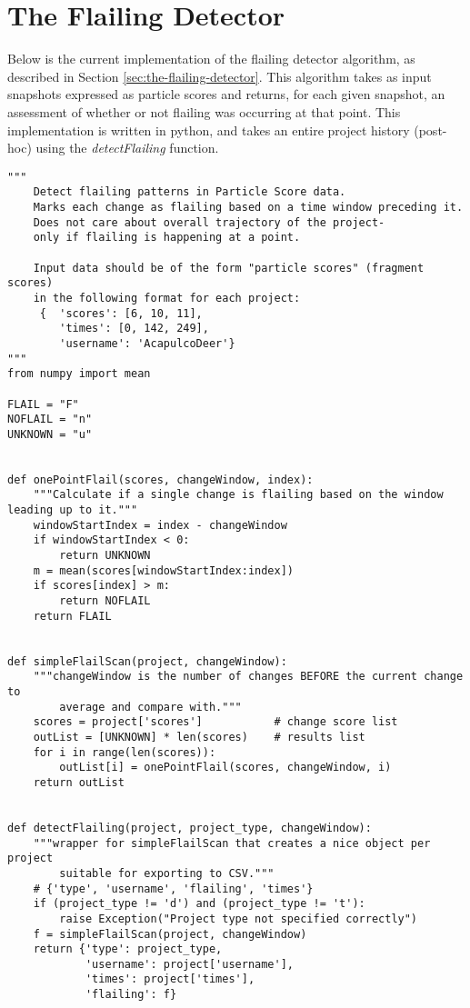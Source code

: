\section{The Flailing Detector}
\label{src:flailing-detector-algorithm}
Below is the current implementation of the flailing detector algorithm, as described in Section \ref{sec:the-flailing-detector}. This algorithm takes as input snapshots expressed as particle scores and returns, for each given snapshot, an assessment of whether or not flailing was occurring at that point. This implementation is written in python, and takes an entire project history (post-hoc) using the \emph{detectFlailing} function. 

\begin{verbatim}
"""
    Detect flailing patterns in Particle Score data.
    Marks each change as flailing based on a time window preceding it.
    Does not care about overall trajectory of the project- 
    only if flailing is happening at a point.
    
    Input data should be of the form "particle scores" (fragment scores) 
    in the following format for each project:
     {  'scores': [6, 10, 11],
        'times': [0, 142, 249],
        'username': 'AcapulcoDeer'}
"""
from numpy import mean

FLAIL = "F"
NOFLAIL = "n"
UNKNOWN = "u"


def onePointFlail(scores, changeWindow, index):
    """Calculate if a single change is flailing based on the window leading up to it."""
    windowStartIndex = index - changeWindow
    if windowStartIndex < 0:
        return UNKNOWN
    m = mean(scores[windowStartIndex:index])
    if scores[index] > m:
        return NOFLAIL
    return FLAIL


def simpleFlailScan(project, changeWindow):
    """changeWindow is the number of changes BEFORE the current change to 
        average and compare with."""
    scores = project['scores']           # change score list
    outList = [UNKNOWN] * len(scores)    # results list
    for i in range(len(scores)):
        outList[i] = onePointFlail(scores, changeWindow, i)
    return outList


def detectFlailing(project, project_type, changeWindow):
    """wrapper for simpleFlailScan that creates a nice object per project 
        suitable for exporting to CSV."""
    # {'type', 'username', 'flailing', 'times'}
    if (project_type != 'd') and (project_type != 't'):
        raise Exception("Project type not specified correctly")
    f = simpleFlailScan(project, changeWindow)
    return {'type': project_type, 
            'username': project['username'], 
            'times': project['times'], 
            'flailing': f}

\end{verbatim}


